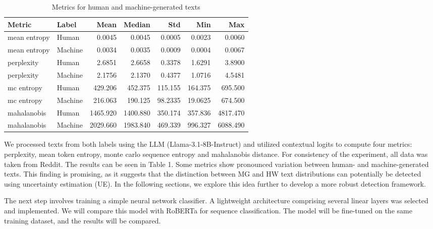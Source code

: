 \documentclass[a4paper, 12pt]{article}
\begin{document}
\begin{table}[ht]
\centering
\begin{tabular}{llrrrrr}
\toprule
\textbf{Metric} & \textbf{Label} & \textbf{Mean} & \textbf{Median} & \textbf{Std} & \textbf{Min} & \textbf{Max} \\
\midrule
mean entropy   & Human   & 0.0045   & 0.0045   & 0.0005   & 0.0023   & 0.0060   \\
mean entropy   & Machine & 0.0034   & 0.0035   & 0.0009   & 0.0004   & 0.0067   \\
perplexity      & Human   & 2.6851   & 2.6658   & 0.3378   & 1.6291   & 3.8900   \\
perplexity      & Machine & 2.1756   & 2.1370   & 0.4377   & 1.0716   & 4.5481   \\
mc entropy     & Human   & 429.206  & 452.375  & 115.155  & 164.375  & 695.500  \\
mc entropy     & Machine & 216.063  & 190.125  & 98.2335  & 19.0625  & 674.500  \\
mahalanobis     & Human   & 1465.920 & 1400.880 & 350.174  & 357.836  & 4817.470 \\
mahalanobis     & Machine & 2029.660 & 1983.840 & 469.339  & 996.327  & 6088.490 \\
\bottomrule
\end{tabular}
\caption{Metrics for human and machine-generated texts}
\label{tab:metric-by-label}
\end{table}


We processed texts from both labels using the LLM (Llama-3.1-8B-Instruct) and utilized contextual logits to compute four metrics: perplexity, mean token entropy, monte carlo sequence entropy and mahalanobis distance. For consistency of the experiment, all data was taken from Reddit. The results can be seen in Table 1. Some metrics show pronounced variation between human- and machine-generated texts. This finding is promising, as it suggests that the distinction between MG and HW text distributions can potentially be detected using uncertainty estimation (UE). In the following sections, we explore this idea further to develop a more robust detection framework. 

The next step involves training a simple neural network classifier. A lightweight architecture comprising several linear layers was selected and implemented. We will compare this model with RoBERTa for sequence classification. The model will be fine-tuned on the same training dataset, and the results will be compared.
\end{document}
